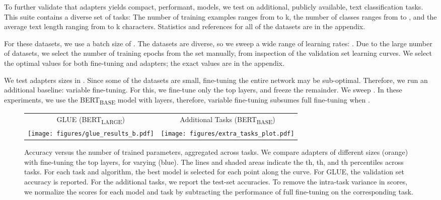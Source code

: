 \documentclass{article}
\begin{document}
To further validate that adapters yields compact, performant, models, we test on additional, publicly available, text classification tasks.
This suite contains a diverse set of tasks:
The number of training examples ranges from  to k,
the number of classes ranges from  to ,
and the average text length ranging from  to k characters.
Statistics and references for all of the datasets are in the appendix.

For these datasets, we use a batch size of .
The datasets are diverse, so we sweep a wide range of learning rates:
.
Due to the large number of datasets, we select the number of training epochs from the set  manually, from inspection of the validation set learning curves.
We select the optimal values for both fine-tuning and adapters; the exact values are in the appendix.

We test adapters sizes in .
Since some of the datasets are small, fine-tuning the entire network may be sub-optimal.
Therefore, we run an additional baseline: variable fine-tuning.
For this, we fine-tune only the top  layers, and freeze the remainder.
We sweep .
In these experiments, we use the BERT\textsubscript{BASE} model with  layers,
therefore, variable fine-tuning subsumes full fine-tuning when .

\begin{figure*}[t]
\centering
\vskip-1mm
\begin{tabular}{cc}
GLUE (BERT\textsubscript{LARGE}) & Additional Tasks (BERT\textsubscript{BASE}) \\
\texttt{[image: figures/glue\_results\_b.pdf]}&
\texttt{[image: figures/extra\_tasks\_plot.pdf]}
\end{tabular}
\vskip-2mm
\caption{
Accuracy versus the number of trained parameters, aggregated across tasks.
We compare adapters of different sizes (orange) with fine-tuning the top  layers, for varying  (blue).
The lines and shaded areas indicate the th, th, and th percentiles across tasks.
For each task and algorithm, the best model is selected for each point along the curve.
For GLUE, the validation set accuracy is reported.
For the additional tasks, we report the test-set accuracies.
To remove the intra-task variance in scores,
we normalize the scores for each model and task by subtracting the performance of full fine-tuning on the corresponding task.
}
\label{fig:tradeoff_alltasks}
\end{figure*}
\end{document}
